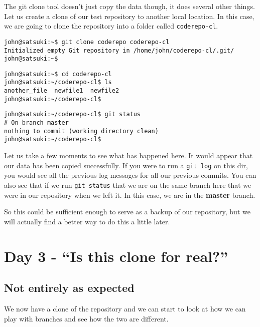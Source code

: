 The git clone tool doesn't just copy the data though, it does several other things.  Let us create a clone of our test repository to another local location.  In this case, we are going to clone the repository into a folder called \texttt{coderepo-cl}.

\begin{Verbatim}[frame=leftline,framerule=1mm,fontsize=\relsize{-3}] 
john@satsuki:~$ git clone coderepo coderepo-cl
Initialized empty Git repository in /home/john/coderepo-cl/.git/
john@satsuki:~$ 
\end{Verbatim}

\begin{Verbatim}[frame=leftline,framerule=1mm,fontsize=\relsize{-3}] 
john@satsuki:~$ cd coderepo-cl
john@satsuki:~/coderepo-cl$ ls 
another_file  newfile1  newfile2
john@satsuki:~/coderepo-cl$
\end{Verbatim}

\begin{Verbatim}[frame=leftline,framerule=1mm,fontsize=\relsize{-3}] 
john@satsuki:~/coderepo-cl$ git status
# On branch master
nothing to commit (working directory clean)
john@satsuki:~/coderepo-cl$ 
\end{Verbatim}

Let us take a few moments to see what has happened here.  It would appear that our data has been copied successfully.  If you were to run a \texttt{git log} on this dir, you would see all the previous log messages for all our previous commits.  You can also see that if we run \texttt{git status} that we are on the same branch here that we were in our repository when we left it.  In this case, we are in the \textbf{master} branch.

So this could be sufficient enough to serve as a backup of our repository, but we will actually find a better way to do this a little later.

\section{Day 3 - ``Is this clone for real?''}
\subsection{Not entirely as expected}

We now have a clone of the repository and we can start to look at how we can play with branches and see how the two are different.

